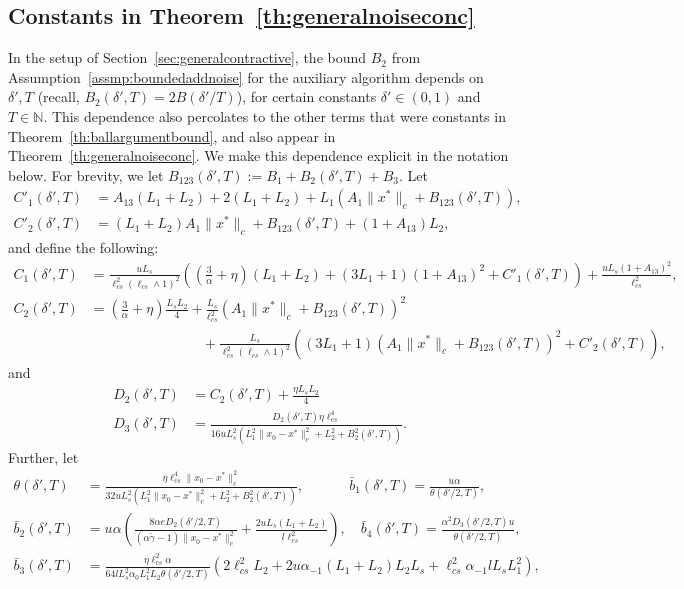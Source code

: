 \documentclass{article}
\newcommand{\lrp}[1]{\left( #1 \right)}
\newcommand{\N}{\mathbb{N}}
\newcommand{\lcs}{\ell_{cs}}
\begin{document}
\subsection{Constants in Theorem~\ref{th:generalnoiseconc}}\label{app:const_general_contractive}
In the setup of Section~\ref{sec:generalcontractive}, the bound $B_2$ from Assumption~\ref{assmp:boundedaddnoise} for the auxiliary algorithm depends on ${\delta'}, {T}$ (recall, $B_2(\delta',T) = 2B(\delta'/T)$), for certain constants $\delta'\in (0,1)$ and $T\in\N$. This dependence also percolates to the other terms that were constants in Theorem~\ref{th:ballargumentbound}, and also appear in Theorem~\ref{th:generalnoiseconc}. We make this dependence explicit in the notation below. For brevity, we let $B_{123}(\delta',T) := B_1 + B_2(\delta',T) + B_3$. Let 
\begin{align*}
C'_1(\delta',T) &= A_{13}(L_1+L_2) + 2(L_1+L_2) + L_1\lrp{A_1\|x^*\|_c + B_{123}(\delta',T)},\\ C'_2(\delta',T) &= (L_1 + L_2){A_1 \|x^*\|_c + B_{123}(\delta', T)} + (1+A_{13})L_2,
\end{align*}
and define the following: 
\begin{align*}
    C_1(\delta',T) &= \tfrac{u L_s}{\lcs^2\lrp{\lcs\wedge 1}^2} \lrp{\lrp{\tfrac{3}{\alpha} + \eta}(L_1+L_2) + (3L_1+1) (1+A_{13})^2 + C'_1(\delta',T)}  + \tfrac{u L_s(1+A_{13})^2}{\lcs^2},\\
    C_2(\delta',T) &=   \lrp{\tfrac{3}{\alpha} + \eta} \tfrac{L_sL_2}{4}  + \tfrac{L_s}{\lcs^2}\lrp{A_1\|x^*\|_c + B_{123}(\delta', T)}^2 \\
    &\qquad \qquad \qquad \qquad + \tfrac{ L_s }{\lcs^2 \lrp{\lcs \wedge 1}^2}\lrp{(3L_1+1) (A_{1} \|x^*\|_c + B_{123}(\delta',T))^2 + C'_2(\delta',T)},
\end{align*}
and
\begin{align*}
    D_2(\delta',T) &= C_2(\delta',T) + \tfrac{\eta L_sL_2}{4}\\
    D_3(\delta',T) &= \frac{ D_2(\delta',T) \eta \lcs^4 }{16 u L^2_s \lrp{L^2_1\|x_0 - x^*\|^2_c + L^2_2 + B^2_2(\delta', T)}}.     
\end{align*}
    Further, let
    \begin{align*}
    \theta(\delta',T) &=  \frac{\eta \lcs^4 \|x_0 - x^*\|^2_c}{32 u L^2_s \lrp{L^2_1\|x_0 - x^*\|^2_c + L^2_2 +  B^2_2(\delta', T)} }, \qquad \quad~\bar{b}_1(\delta',T) = \frac{u\alpha }{\theta(\delta'/2, T)},\\
    \bar{b}_2(\delta',T) &= u\alpha\lrp{ \frac{8\alpha e  D_2(\delta'/2, T)}{(\alpha \tilde{\gamma} - 1)\|x_0 - x^*\|^2_c} + \frac{ 2u L_s (L_1 + L_2)  }{ l\lcs^2}}, \quad \bar{b}_4(\delta',T) = \frac{\alpha^2 D_3(\delta'/2,T) u}{\theta(\delta'/2, T)}, \\
    \bar{b}_3(\delta', T) &= \frac{\eta\lcs^2 \alpha}{64 l L^2_s \alpha_0 L^2_1 L_2 \theta(\delta'/2, T) }\lrp{2\lcs^2 L_2 +  2 u \alpha_{-1} (L_1 + L_2)  L_2 L_s + \lcs^2 \alpha_{-1} l L_s L^2_1 },
    \end{align*}
\end{document}
